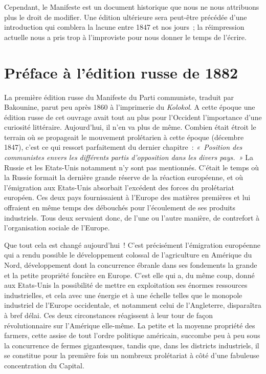 \documentclass[french,twoside]{book} %
\newcommand{\byline}[1]{\bigskip{\RaggedLeft{#1}\par}\bigskip}
\begin{document}
Cependant, le Manifeste est un document historique que nous ne nous attribuons plus le droit de modifier. Une édition ultérieure sera peut-être précédée d’une introduction qui comblera la lacune entre 1847 et nos jours ; la réimpression actuelle nous a pris trop à l’improviste pour nous donner le temps de l’écrire.\par

\byline{Karl Marx, Friedrich Engels ; \\
Londres, 24 juin 1872}

\section[{Préface à l’édition russe de 1882}]{Préface à l’édition russe de 1882}

\noindent La première édition russe du Manifeste du Parti communiste, traduit par Bakounine, parut peu après 1860 à l’imprimerie du \emph{Kolokol}. A cette époque une édition russe de cet ouvrage avait tout au plus pour l’Occident l’importance d’une curiosité littéraire. Aujourd’hui, il n’en va plus de même. Combien était étroit le terrain où se propageait le mouvement prolétarien à cette époque (décembre 1847), c’est ce qui ressort parfaitement du dernier chapitre : \emph{« Position des communistes envers les différents partis d’opposition dans les divers pays. »} La Russie et les Etats-Unis notamment n’y sont pas mentionnés. C'était le temps où la Russie formait la dernière grande réserve de la réaction européenne, et où l’émigration aux Etats-Unis absorbait l’excédent des forces du prolétariat européen. Ces deux pays fournissaient à l’Europe des matières premières et lui offraient en même temps des débouchés pour l’écoulement de ses produits industriels. Tous deux servaient donc, de l’une ou l’autre manière, de contrefort à l’organisation sociale de l’Europe.\par
Que tout cela est changé aujourd’hui ! C'est précisément l’émigration européenne qui a rendu possible le développement colossal de l’agriculture en Amérique du Nord, développement dont la concurrence ébranle dans ses fondements la grande et la petite propriété foncière en Europe. C'est elle qui a, du même coup, donné aux Etats-Unis la possibilité de mettre en exploitation ses énormes ressources industrielles, et cela avec une énergie et à une échelle telles que le monopole industriel de l’Europe occidentale, et notamment celui de l’Angleterre, disparaîtra à bref délai. Ces deux circonstances réagissent à leur tour de façon révolutionnaire sur l’Amérique elle-même. La petite et la moyenne propriété des farmers, cette assise de tout l’ordre politique américain, succombe peu à peu sous la concurrence de fermes gigantesques, tandis que, dans les districts industriels, il se constitue pour la première fois un nombreux prolétariat à côté d’une fabuleuse concentration du Capital.\par
\end{document}
